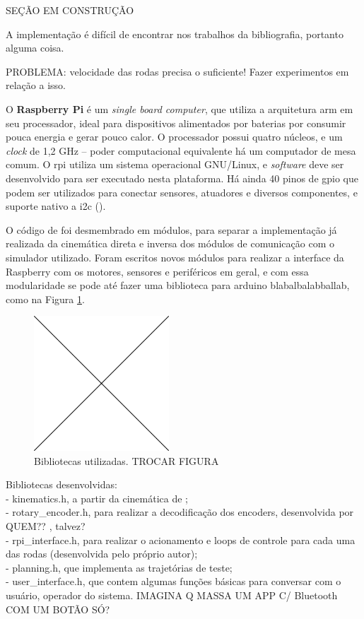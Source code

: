 SEÇÃO EM CONSTRUÇÃO

A implementação é difícil de encontrar nos trabalhos da bibliografia, portanto alguma coisa.

PROBLEMA: velocidade das rodas precisa o suficiente! Fazer experimentos em relação a isso.

O \textbf{Raspberry Pi} é um \emph{single board computer}, que utiliza a arquitetura \acrshort{arm} em seu processador, ideal para dispositivos alimentados por baterias por consumir pouca energia e gerar pouco calor. O processador possui quatro núcleos, e um \emph{clock} de 1,2 GHz -- poder computacional equivalente há um computador de mesa comum. O \acrshort{rpi} utiliza um sistema operacional GNU/Linux, e \emph{software} deve ser desenvolvido para ser executado nesta plataforma. Há ainda 40 pinos de \acrshort{gpio} que podem ser utilizados para conectar sensores, atuadores e diversos componentes, e suporte nativo a \acrshort{i2c} (\cite{upton2014raspberry}).

O código de \cite{ritter2016modelagem} foi desmembrado em módulos, para separar a implementação já realizada da cinemática direta e inversa dos módulos de comunicação com o simulador utilizado. Foram escritos novos módulos para realizar a interface da Raspberry com os motores, sensores e periféricos em geral, e com essa modularidade se pode até fazer uma biblioteca para arduino blabalbalabballab, como na Figura \ref{fig:libs}.

\begin{figure}[h]
  \centering
  \includegraphics[width = 0.45\textwidth]{imagens/edc}
  \caption{Bibliotecas utilizadas. TROCAR FIGURA}
  \label{fig:libs}
\end{figure}

Bibliotecas desenvolvidas: \\
- kinematics.h, a partir da cinemática de \cite{ritter2016modelagem}; \\
- rotary\_encoder.h, para realizar a decodificação dos encoders, desenvolvida por QUEM?? \cite{pigpio}, talvez?\\
- rpi\_interface.h, para realizar o acionamento e loops de controle para cada uma das rodas (desenvolvida pelo próprio autor);\\
- planning.h, que implementa as trajetórias de teste; \\
- user\_interface.h, que contem algumas funções básicas para conversar com o usuário, operador do sistema. IMAGINA Q MASSA UM APP C/ Bluetooth COM UM BOTÃO SÓ?

